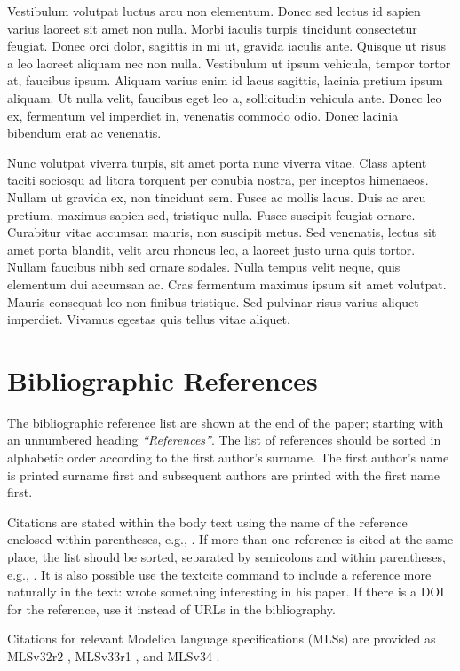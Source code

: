 \documentclass{modelica}
\begin{document}
Vestibulum volutpat luctus arcu non elementum. Donec sed lectus id sapien varius laoreet sit amet non nulla. Morbi iaculis turpis tincidunt consectetur feugiat. Donec orci dolor, sagittis in mi ut, gravida iaculis ante. Quisque ut risus a leo laoreet aliquam nec non nulla. Vestibulum ut ipsum vehicula, tempor tortor at, faucibus ipsum. Aliquam varius enim id lacus sagittis, lacinia pretium ipsum aliquam. Ut nulla velit, faucibus eget leo a, sollicitudin vehicula ante. Donec leo ex, fermentum vel imperdiet in, venenatis commodo odio. Donec lacinia bibendum erat ac venenatis.

Nunc volutpat viverra turpis, sit amet porta nunc viverra vitae. Class aptent taciti sociosqu ad litora torquent per conubia nostra, per inceptos himenaeos. Nullam ut gravida ex, non tincidunt sem. Fusce ac mollis lacus. Duis ac arcu pretium, maximus sapien sed, tristique nulla. Fusce suscipit feugiat ornare. Curabitur vitae accumsan mauris, non suscipit metus. Sed venenatis, lectus sit amet porta blandit, velit arcu rhoncus leo, a laoreet justo urna quis tortor. Nullam faucibus nibh sed ornare sodales. Nulla tempus velit neque, quis elementum dui accumsan ac. Cras fermentum maximus ipsum sit amet volutpat. Mauris consequat leo non finibus tristique. Sed pulvinar risus varius aliquet imperdiet. Vivamus egestas quis tellus vitae aliquet.

\section{Bibliographic References}
The bibliographic reference list are shown at the end of the paper;
starting with an unnumbered heading \emph{``References''}. The list of
references should be sorted in alphabetic order according to the first
author's surname.
The first author's name is printed surname first and subsequent authors are printed with the first name first.

Citations are stated within the body text using the name of the
reference enclosed within parentheses, e.g., \cite{Pantelides:1988}. If
more than one reference is cited at the same place, the list should be
sorted, separated by semicolons and within parentheses, e.g.,
\cite{DuffReid:1978,Pierce:2002,Plotkin:1981}.
It is also possible use the textcite command to include a reference more naturally in the text: \textcite{Pantelides:1988} wrote something interesting in his paper.
If there is a DOI for the reference, use it instead of URLs in the bibliography.

Citations for relevant Modelica language specifications (MLSs) are provided as
MLSv32r2 \cite{MLSv32r2}, MLSv33r1 \cite{MLSv33r1}, and MLSv34 \cite{MLSv34}.
\end{document}
